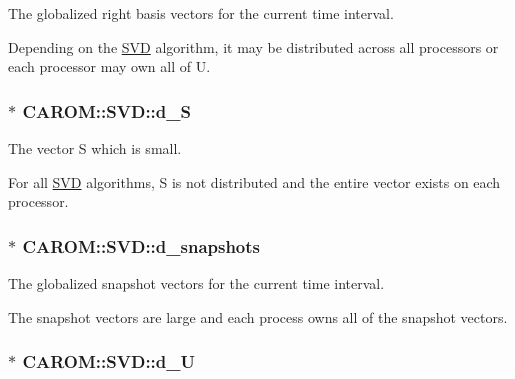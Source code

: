 The globalized right basis vectors for the current time interval. 

Depending on the \hyperlink{class_c_a_r_o_m_1_1_s_v_d}{S\-V\-D} algorithm, it may be distributed across all processors or each processor may own all of U. \hypertarget{class_c_a_r_o_m_1_1_s_v_d_a7e09dc0fc7a80f3718ba9da22406c4cb}{
\subsubsection[{d\-\_\-\-S}]{$\ast$ C\-A\-R\-O\-M\-::\-S\-V\-D\-::d\-\_\-\-S\hspace{0.3cm}{\ttfamily [protected]}}}\label{class_c_a_r_o_m_1_1_s_v_d_a7e09dc0fc7a80f3718ba9da22406c4cb}


The vector S which is small. 

For all \hyperlink{class_c_a_r_o_m_1_1_s_v_d}{S\-V\-D} algorithms, S is not distributed and the entire vector exists on each processor. \hypertarget{class_c_a_r_o_m_1_1_s_v_d_a1a38d353f58b9d825ff23197a3a1a879}{
\subsubsection[{d\-\_\-snapshots}]{$\ast$ C\-A\-R\-O\-M\-::\-S\-V\-D\-::d\-\_\-snapshots\hspace{0.3cm}{\ttfamily [protected]}}}\label{class_c_a_r_o_m_1_1_s_v_d_a1a38d353f58b9d825ff23197a3a1a879}


The globalized snapshot vectors for the current time interval. 

The snapshot vectors are large and each process owns all of the snapshot vectors. \hypertarget{class_c_a_r_o_m_1_1_s_v_d_a8b9b2af990f5ced830dc37826a256491}{
\subsubsection[{d\-\_\-\-U}]{$\ast$ C\-A\-R\-O\-M\-::\-S\-V\-D\-::d\-\_\-\-U\hspace{0.3cm}{\ttfamily [protected]}}}\label{class_c_a_r_o_m_1_1_s_v_d_a8b9b2af990f5ced830dc37826a256491}


